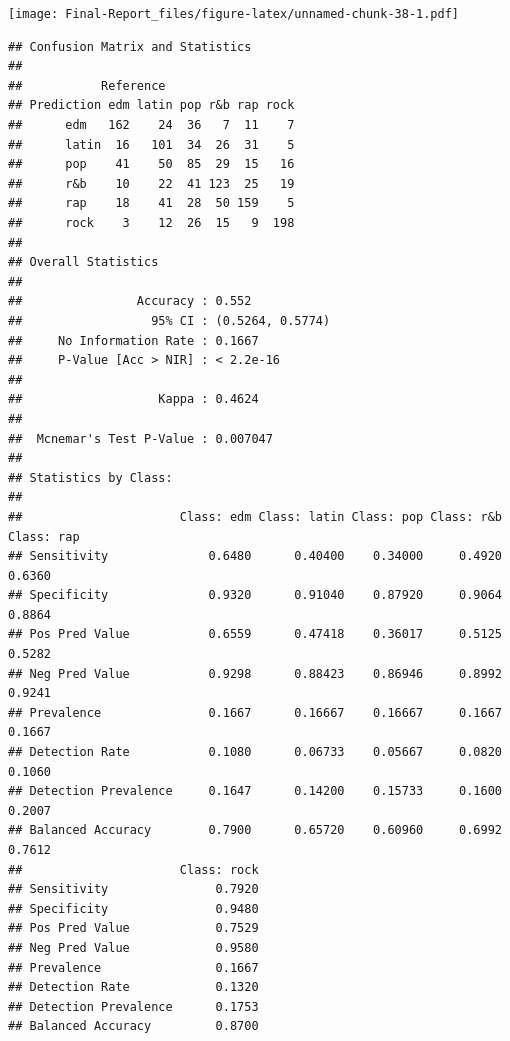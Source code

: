 \documentclass[
]{article}
\newenvironment{Shaded}{\begin{snugshade}}{\end{snugshade}}
\newcommand{\AttributeTok}[1]{\textcolor[rgb]{0.77,0.63,0.00}{#1}}
\newcommand{\CommentTok}[1]{\textcolor[rgb]{0.56,0.35,0.01}{\textit{#1}}}
\newcommand{\FunctionTok}[1]{\textcolor[rgb]{0.00,0.00,0.00}{#1}}
\newcommand{\NormalTok}[1]{#1}
\newcommand{\OtherTok}[1]{\textcolor[rgb]{0.56,0.35,0.01}{#1}}
\newcommand{\SpecialCharTok}[1]{\textcolor[rgb]{0.00,0.00,0.00}{#1}}
\begin{document}
\texttt{[image: Final-Report\_files/figure-latex/unnamed-chunk-38-1.pdf]}

\begin{Shaded}
\end{Shaded}

\begin{verbatim}
## Confusion Matrix and Statistics
## 
##           Reference
## Prediction edm latin pop r&b rap rock
##      edm   162    24  36   7  11    7
##      latin  16   101  34  26  31    5
##      pop    41    50  85  29  15   16
##      r&b    10    22  41 123  25   19
##      rap    18    41  28  50 159    5
##      rock    3    12  26  15   9  198
## 
## Overall Statistics
##                                           
##                Accuracy : 0.552           
##                  95% CI : (0.5264, 0.5774)
##     No Information Rate : 0.1667          
##     P-Value [Acc > NIR] : < 2.2e-16       
##                                           
##                   Kappa : 0.4624          
##                                           
##  Mcnemar's Test P-Value : 0.007047        
## 
## Statistics by Class:
## 
##                      Class: edm Class: latin Class: pop Class: r&b Class: rap
## Sensitivity              0.6480      0.40400    0.34000     0.4920     0.6360
## Specificity              0.9320      0.91040    0.87920     0.9064     0.8864
## Pos Pred Value           0.6559      0.47418    0.36017     0.5125     0.5282
## Neg Pred Value           0.9298      0.88423    0.86946     0.8992     0.9241
## Prevalence               0.1667      0.16667    0.16667     0.1667     0.1667
## Detection Rate           0.1080      0.06733    0.05667     0.0820     0.1060
## Detection Prevalence     0.1647      0.14200    0.15733     0.1600     0.2007
## Balanced Accuracy        0.7900      0.65720    0.60960     0.6992     0.7612
##                      Class: rock
## Sensitivity               0.7920
## Specificity               0.9480
## Pos Pred Value            0.7529
## Neg Pred Value            0.9580
## Prevalence                0.1667
## Detection Rate            0.1320
## Detection Prevalence      0.1753
## Balanced Accuracy         0.8700
\end{verbatim}
\end{document}
